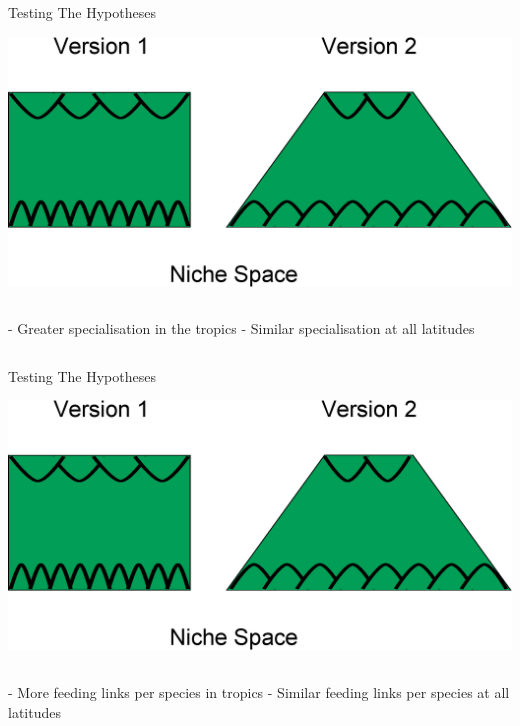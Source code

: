 \documentclass{beamer}
\begin{document}
  \begin{frame}{Testing The Hypotheses}

    \begin{center}
      \includegraphics[width=.8\textwidth]{Figures/hypothesis_comparison.eps}

    \end{center}

    \begin{columns}
    \column{.5in}
    \column{1.75in}
      - Greater specialisation in the tropics
    \column{.5in}
    \column{1.75in}
      - Similar specialisation at all latitudes
    \column{.5in}
    \end{columns}

  \end{frame}


  \begin{frame}{Testing The Hypotheses}

    \begin{center}
      \includegraphics[width=.8\textwidth]{Figures/hypothesis_comparison.eps}

    \end{center}

    \begin{columns}
    \column{.5in}
    \column{1.75in}
      - More feeding links per species in tropics
    \column{.5in}
    \column{1.75in}
      - Similar feeding links per species at all latitudes
    \column{.5in}
    \end{columns}

  \end{frame}
\end{document}

